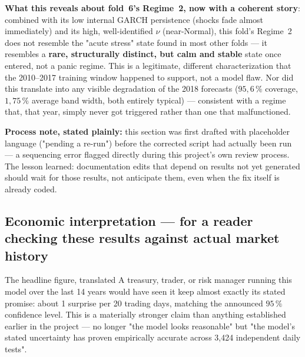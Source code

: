 \documentclass[12pt,a4paper]{article}
\begin{document}
	\vspace{0.3cm}
	
	\textbf{What this reveals about fold~6's Regime~2, now with
		a coherent story}: combined with its low internal GARCH
	persistence (shocks fade almost immediately) and its high,
	well-identified $\nu$ (near-Normal), this fold's Regime~2 does
	not resemble the "acute stress" state found in most
	other folds --- it resembles a \textbf{rare,
		structurally distinct, but calm and stable} state once entered, not a
	panic regime. This is a legitimate, different
	characterization that the 2010--2017 training window happened to
	support, not a model flaw. Nor did this translate into
	any visible degradation of the 2018 forecasts ($95{,}6\,\%$
	coverage, $1{,}75\,\%$ average band width, both entirely
	typical) --- consistent with a regime that, that year, simply never
	got triggered rather than one that malfunctioned.
	
	\newpage
	
	\begin{limitbox}
		\textbf{Process note, stated plainly:} this section was
		first drafted with placeholder language
		("pending a re-run") before the corrected script had
		actually been run --- a sequencing error flagged directly during
		this project's own review process. The lesson
		learned: documentation edits that depend on
		results not yet generated should wait for those results, not
		anticipate them, even when the fix itself is already coded.
	\end{limitbox}
	
	\subsection{Economic interpretation --- for a reader checking these results against actual market history}
	
	\begin{econbox} The headline figure, translated
		A treasury, trader, or risk manager running
		this model over the last 14 years would have seen it keep
		almost exactly its stated promise: about 1 surprise per 20 trading
		days, matching the announced $95\,\%$ confidence
		level. This is a materially stronger claim than anything
		established earlier in the project --- no longer "the
		model looks reasonable" but "the model's stated
		uncertainty has proven empirically accurate across
		3,424 independent daily tests".
	\end{econbox}
	
	\vspace{0.3cm}
	
\end{document}

